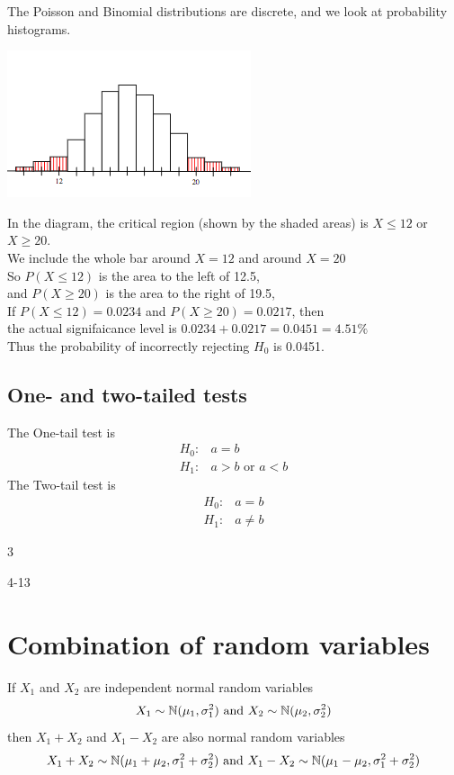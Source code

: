 \documentclass[a4paper]{article}
\begin{document}
The Poisson and Binomial distributions are
discrete, and we look at probability histograms.

\begin{center}
	\includegraphics[scale=0.5]{img_S/15_intro2}
\end{center}

In the diagram, the critical region (shown by the
shaded areas) is $X\leq 12$ or $X\geq 20$.\\

We include the whole bar around $X=12$ and around $X=20$\\

So $P(X\leq 12)$ is the area to the left of 12.5,\\
and $P(X\geq 20)$ is the area to the right of 19.5,\\

If $P(X\leq 12)=0.0234$ and $P(X\geq 20)=0.0217$, then \\
the actual signifaicance level is $0.0234+0.0217=0.0451=4.51\%$ \\
Thus the probability of incorrectly rejecting $H_0$ is 0.0451.
\subsection{One- and two-tailed tests}
The One-tail test is
\begin{align*}
	H_0: & a=b                 \\
	H_1: & a>b \mbox{~or~} a<b
\end{align*}
The Two-tail test is
\begin{align*}
	H_0: & a=b     \\
	H_1: & a\neq b
\end{align*}
\begin{eg}
	3
\end{eg}

\begin{eg}
	4-13
\end{eg}

\section{Combination of random variables}
If $X_1$ and $X_2$ are independent normal random variables
\[
	X_1 \sim \mathbb{N}(\mu_1,\sigma_1^2) \mbox{~and~} X_2 \sim \mathbb{N}(\mu_2,\sigma_2^2)
\]
then $X_1+X_2$ and $X_1-X_2$ are also normal random variables
\[
	X_1+X_2\sim \mathbb{N}(\mu_1+\mu_2,\sigma_1^2+\sigma_2^2) \mbox{~and~} X_1-X_2\sim \mathbb{N}(\mu_1-\mu_2,\sigma_1^2+\sigma_2^2)
\]
\end{document}
